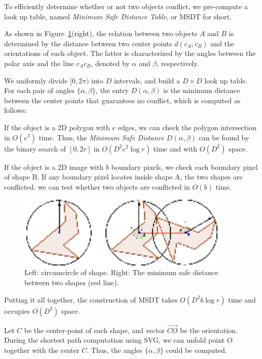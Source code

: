 To efficiently determine whether or not two objects conflict, we
pre-compute a look up table, named \textit{Minimum Safe Distance
Table}, or MSDT for short.

As shown in Figure~\ref{fig:singleshapedemo}(right), the relation
between two objects $A$ and $B$ is determined by the distance
between two center points $d(c_A,c_B)$ and the orientations of each
object. The latter is characterized by the angles between the polar
axis and the line $c_Ac_B$, denoted by $\alpha$ and $\beta$,
respectively.

We uniformly divide $[0, 2\pi)$ into $D$ intervals, and build a $D
\times D$ look up table. For each pair of angles $\{\alpha,
\beta\}$, the entry $D(\alpha,\beta)$ is the minimum distance
between the center points that guarantees no conflict, which is
computed as follows:

If the object is a 2D polygon with $e$ edges, we can check the
polygon intersection in $O(e^2)$ time. Thus, the \textit{Minimum
Safe Distance} $D(\alpha, \beta)$ can be found by the binary search
of $[0, 2r]$ in $O(D^2 e^2 \log r)$ time and with $O(D^2)$ space.

If the object is a 2D image with $b$ boundary pixels, we check each boundary pixel of shape B. If any
boundary pixel locates inside shape A, the two shapes are
conflicted. we can test whether two objects are conflicted in $O(b)$
time.

\begin{figure}[htbp]
\includegraphics[width=0.9\textwidth]{figs/asd/singleshapedemo.png}
\caption{Left: circumcircle of shape. Right: The minimum safe distance between two shapes (red line).} \label{fig:singleshapedemo}
\end{figure}


  Putting it all together, the construction of MSDT takes $O(D^2 b \log r)$ time and occupies $O(D^2)$ space.

Let $C$ be the center-point of each shape, and vector
$\overrightarrow{CO}$ be the orientation. During the shortest path computation using SVG, we can unfold point $O$ together with the center $C$.
Thus, the angles $\{\alpha, \beta\}$ could be computed.

